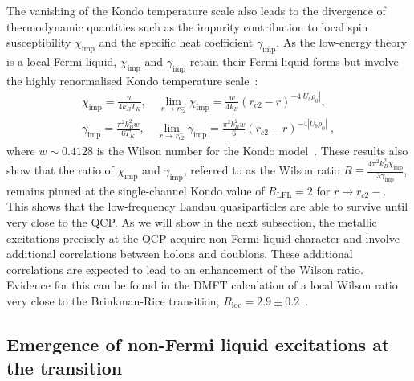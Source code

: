 \documentclass{iopart}
\begin{document}
The vanishing of the Kondo temperature scale also leads to the divergence of thermodynamic quantities such as the impurity contribution to local spin susceptibility \(\chi_\text{imp}\) and the specific heat coefficient \(\gamma_\text{imp}\). As the low-energy theory is a local Fermi liquid, \(\chi_\text{imp}\) and \(\gamma_\text{imp}\) retain their Fermi liquid forms but involve the highly renormalised Kondo temperature scale~\cite{wilson1975,hewson_1993_prl}:
\begin{eqnarray}
	\chi_\text{imp} = \frac{w}{4k_B T_K}, \quad\lim_{r \to r_{c2}^-}\chi_\text{imp} = \frac{w}{4k_B}\left(r_{c2} - r\right)^{-4|U_b\rho_0|}, \nonumber\\
	\gamma_\text{imp} = \frac{\pi^2 k_B^2 w}{6 T_K}, \quad \lim_{r \to r_{c2}^-}\gamma_\text{imp} = \frac{\pi^2 k_B^2 w}{6}\left(r_{c2} - r\right)^{-4|U_b\rho_0|}~,
\end{eqnarray}
where \(w \sim 0.4128\) is the Wilson number for the Kondo model~\cite{wilson1975,anirban_kondo}. These results also show that the ratio of \(\chi_\text{imp}\) and \(\gamma_\text{imp}\), referred to as the Wilson ratio \(R \equiv \frac{4\pi^2 k_B^2 \chi_\text{imp}}{3 \gamma_\text{imp}}\), remains pinned at the single-channel Kondo value of \(R_\text{LFL} = 2\) for \(r \to r_{c2}-\). This shows that the low-frequency Landau quasiparticles are able to survive until very close to the QCP. As we will show in the next subsection, the metallic excitations precisely at the QCP acquire non-Fermi liquid character and involve additional correlations between holons and doublons. These additional correlations are expected to lead to an enhancement of the Wilson ratio. Evidence for this can be found in the DMFT calculation of a local Wilson ratio very close to the Brinkman-Rice transition, \(R_\text{loc} = 2.9 \pm 0.2\)~\cite{georges1996}.

\subsection{Emergence of non-Fermi liquid excitations at the transition}
\end{document}
